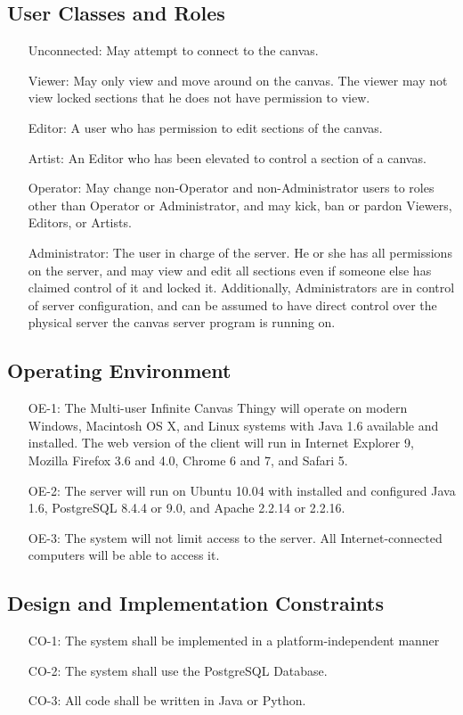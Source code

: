 \documentclass[11pt,oneside,a4paper]{article}
\begin{document}
\subsection{User Classes and Roles}
\begin{itemize}
\item[Unconnected:] May attempt to connect to the canvas.
\item[Viewer:] May only view and move around on the canvas.  The viewer may not view locked sections that he does not have permission to view.
\item[Editor:] A user who has permission to edit sections of the canvas.
\item[Artist:] An Editor who has been elevated to control a section of a canvas.
\item[Operator:] May change non-Operator and non-Administrator users to roles other than Operator or Administrator, and may kick, ban or pardon Viewers, Editors, or Artists.
\item[Administrator:]  The user in charge of the server. He or she has all permissions on the server, and may view and edit all sections even if someone else has claimed control of it and locked it. Additionally, Administrators are in control of server configuration, and can be assumed to have direct control over the physical server the canvas server program is running on.
\end{itemize}
\subsection{Operating Environment}
\begin{itemize}
\item[OE-1:] The Multi-user Infinite Canvas Thingy will operate on modern Windows, Macintosh OS X, and Linux systems with Java 1.6 available and installed. The web version of the client will run in Internet Explorer 9, Mozilla Firefox 3.6 and 4.0,  Chrome 6 and 7, and Safari 5.
\item[OE-2:] The server will run on Ubuntu 10.04 with installed and configured Java 1.6, PostgreSQL 8.4.4 or 9.0, and Apache 2.2.14 or 2.2.16.
\item[OE-3:]  The system will not limit access to the server. All Internet-connected computers will be able to access it.
\end{itemize}
\subsection{Design and Implementation Constraints}
\begin{itemize}
\item[CO-1:] The system shall be implemented in a platform-independent manner
\item[CO-2:]  The system shall use the PostgreSQL Database.
\item[CO-3:] All code shall be written in Java or Python.
\end{itemize}
\end{document}
